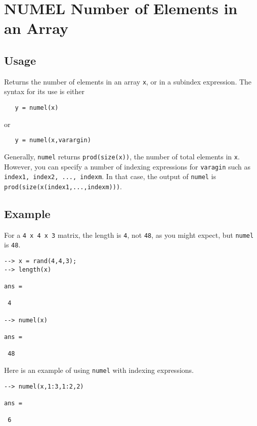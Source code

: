 \section{NUMEL Number of Elements in an Array}

\subsection{Usage}

Returns the number of elements in an array \verb|x|, or in a subindex
expression.  The syntax for its use is either
\begin{verbatim}
   y = numel(x)
\end{verbatim}
or 
\begin{verbatim}
   y = numel(x,varargin)
\end{verbatim}
Generally, \verb|numel| returns \verb|prod(size(x))|, the number of total
elements in \verb|x|.  However, you can specify a number of indexing
expressions for \verb|varagin| such as \verb|index1, index2, ..., indexm|.
In that case, the output of \verb|numel| is 
\verb|prod(size(x(index1,...,indexm)))|.
\subsection{Example}

For a \verb|4 x 4 x 3| matrix, the length is \verb|4|, not \verb|48|, as you 
might expect, but \verb|numel| is \verb|48|.
\begin{verbatim}
--> x = rand(4,4,3);
--> length(x)

ans = 

 4 

--> numel(x)

ans = 

 48 
\end{verbatim}
Here is an example of using \verb|numel| with indexing expressions.
\begin{verbatim}
--> numel(x,1:3,1:2,2)

ans = 

 6 
\end{verbatim}
